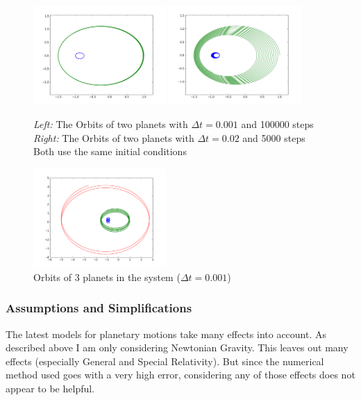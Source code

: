 \documentclass[a4paper,onesided,10pt]{article}
\begin{document}
\begin{figure}[h!]
	\centering
		\includegraphics[width=0.45\textwidth]{2_Planets_0-001.png}
		\includegraphics[width=0.45\textwidth]{2_Planets_0-02.png}
	\caption{\textit{Left:} The Orbits of two planets with $\Delta t = 0.001$ and 100000 steps \hspace{\textwidth}
		\textit{Right:} The Orbits of two planets with $\Delta t = 0.02$ and 5000 steps \hspace{\textwidth}
		Both use the same initial conditions}
	\label{fig:presection}
\end{figure}
\begin{figure}[h!]
	\centering
		\includegraphics[width=0.45\textwidth]{3_Planets_0-001.png}
	\caption{Orbits of 3 planets in the system ($\Delta t = 0.001$)}
	\label{fig:3_Planets_0-001}
\end{figure}

\subsubsection{Assumptions and Simplifications}
The latest models for planetary motions take many effects into account. As described above I am only considering Newtonian Gravity. This leaves out many effects (especially General and Special Relativity). But since the numerical method used goes with a very high error, considering any of those effects does not appear to be helpful.
\end{document}
